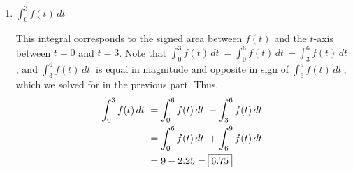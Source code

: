 \documentclass{article}
\begin{document}
\begin{enumerate}
\begin{enumerate}
\begin{enumerate}
      \begin{solution}
        
        $\displaystyle \int_{0}^{9} f(t)\,dt\ =\displaystyle \int_{0}^{6} f(t)\,dt\ + \displaystyle \int_{6}^{9} f(t)\,dt\ $. We can interpret $\displaystyle \int_{6}^{9} f(t)\,dt\ $ as the signed area between $f(t)$ and the $t$-axis between $t=6$ and $t=9$, which is a triangle with height $1.5$ and base $3$, which has an signed area of $-2.25$. Thus, $ \displaystyle \int_{0}^{6} f(t)\,dt\ +\displaystyle \int_{6}^{9} f(t)\,dt\ = 9 - 2.25 = \fbox{6.75}$.
      \end{solution}
      \vfill
      \item $\displaystyle \int_{0}^{3} f(t)\,dt\ $
      
      \begin{solution}
          This integral corresponds to the signed area between $f(t)$ and the $t$-axis between $t=0$ and $t=3$. Note that $\displaystyle \int_{0}^{3} f(t)\,dt\ =\displaystyle \int_{0}^{6} f(t)\,dt\ - \displaystyle \int_{3}^{6} f(t)\,dt\ $, and $\displaystyle \int_{3}^{6} f(t)\,dt\ $ is equal in magnitude and opposite in sign of $\displaystyle \int_{6}^{9} f(t)\,dt\ $, which we solved for in the previous part. Thus, 
          \begin{align*}
              \displaystyle \int_{0}^{3} f(t)\,dt\ &=\displaystyle \int_{0}^{6} f(t)\,dt\ - \displaystyle \int_{3}^{6} f(t)\,dt\
              \\
              &=\displaystyle \int_{0}^{6} f(t)\,dt\ + \displaystyle \int_{6}^{9} f(t)\,dt\ 
              \\
              &= 9 - 2.25 = \fbox{6.75}
          \end{align*}
      \end{solution}
      \vfill
      

\end{enumerate}
\end{enumerate}
\end{enumerate}
\end{document}
